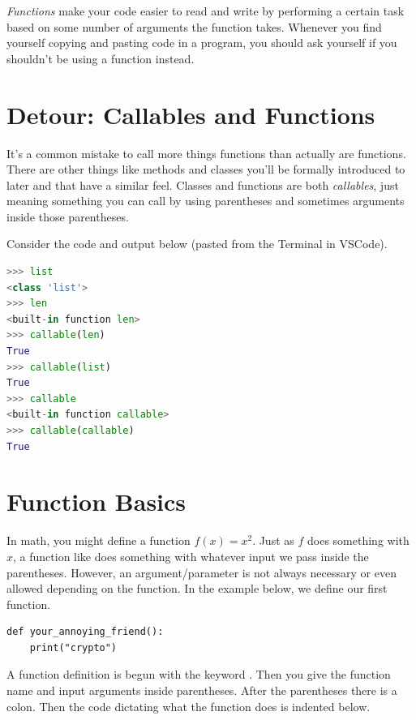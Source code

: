 \noindent {}

\emph{Functions} make your code easier to read and write by performing a certain task based on some number of arguments the function takes. Whenever you find yourself copying and pasting code in a program, you should ask yourself if you shouldn't be using a function instead. 


\section{Detour: Callables and Functions}

It's a common mistake to call more things functions than actually are functions. There are other things like methods and classes you'll be formally introduced to later and that have a similar feel. Classes and functions are both \emph{callables}, just meaning something you can call by using parentheses and sometimes arguments inside those parentheses.

Consider the code and output below (pasted from the Terminal in VSCode). 
\begin{lstlisting}[language = Python, keywordstyle = \color{black}, stringstyle = \color{black}]
>>> list
<class 'list'>
>>> len
<built-in function len>
>>> callable(len)
True
>>> callable(list)
True
>>> callable
<built-in function callable>
>>> callable(callable)
True
\end{lstlisting}


\section{Function Basics}

In math, you might define a function $f(x) = x^2$. Just as $f$ does something with $x$, a function like 
 does something with whatever input we pass inside the parentheses. However, an argument/parameter is not always necessary or even allowed depending on the function. In the example below, we define our first function.

\begin{lstlisting}
def your_annoying_friend():
    print("crypto")
\end{lstlisting}

A function definition is begun with the keyword . Then you give the function name and input arguments inside parentheses. After the parentheses there is a colon. Then the code dictating what the function does is indented below.


